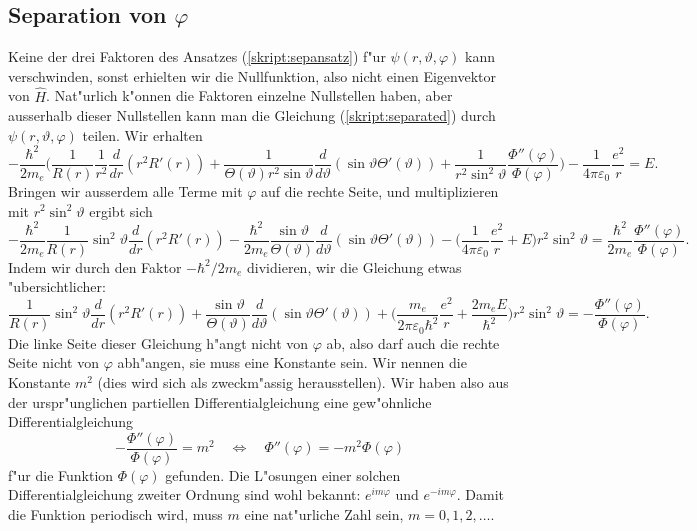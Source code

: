 \subsection{Separation von $\varphi$}
Keine der drei Faktoren des Ansatzes (\ref{skript:sepansatz}) f"ur
$\psi(r,\vartheta,\varphi)$ kann verschwinden, sonst erhielten wir die 
Nullfunktion, also nicht einen Eigenvektor von $\hat H$.
Nat"urlich k"onnen die Faktoren einzelne Nullstellen haben, aber ausserhalb
dieser Nullstellen kann man die Gleichung (\ref{skript:separated}) durch 
$\psi(r,\vartheta,\varphi)$ teilen. Wir erhalten
\begin{equation*}
-\frac{\hbar^2}{2m_e}\biggl(
\frac{1}{R(r)}
\frac{1}{r^2}
\frac{d}{dr}(r^2R'(r))
+
\frac{1}{\Theta(\vartheta) r^2\sin\vartheta}\frac{d}{d\vartheta}(\sin\vartheta \Theta'(\vartheta))
+
\frac{1}{r^2\sin^2\vartheta}\frac{\Phi''(\varphi)}{\Phi(\varphi)}
\biggr)
-\frac1{4\pi\varepsilon_0}\frac{e^2}{r}
=
E.
\end{equation*}
Bringen wir ausserdem alle Terme mit $\varphi$ auf die rechte Seite,
und multiplizieren mit $r^2\sin^2\vartheta$
ergibt sich
\begin{equation*}
-\frac{\hbar^2}{2m_e}
\frac{1}{R(r)}\sin^2\vartheta \frac{d}{dr}(r^2R'(r))
-
\frac{\hbar^2}{2m_e}
\frac{\sin\vartheta}{\Theta(\vartheta) }\frac{d}{d\vartheta}(\sin\vartheta \Theta'(\vartheta))
-\biggl(\frac1{4\pi\varepsilon_0}\frac{e^2}{r}
+
E\biggr)r^2\sin^2\vartheta
=
\frac{\hbar^2}{2m_e}\frac{\Phi''(\varphi)}{\Phi(\varphi)}.
\end{equation*}
Indem wir durch den Faktor $-\hbar^2/2m_e$ dividieren, wir die Gleichung
etwas "ubersichtlicher:
\begin{equation}
\frac{1}{R(r)}\sin^2\vartheta \frac{d}{dr}(r^2R'(r))
+
\frac{\sin\vartheta}{\Theta(\vartheta) }\frac{d}{d\vartheta}(\sin\vartheta \Theta'(\vartheta))
+\biggl(\frac{m_e}{2\pi\varepsilon_0\hbar^2}\frac{e^2}{r}
+
\frac{2m_eE}{\hbar^2}\biggr)r^2\sin^2\vartheta
=
-\frac{\Phi''(\varphi)}{\Phi(\varphi)}.
\label{skript:phisepariert}
\end{equation}
Die linke Seite dieser Gleichung h"angt nicht von $\varphi$ ab, also
darf auch die rechte Seite nicht von $\varphi$ abh"angen, sie muss
eine Konstante sein. Wir nennen die Konstante $m^2$ (dies wird sich
als zweckm"assig herausstellen). Wir haben also aus der urspr"unglichen
partiellen Differentialgleichung eine gew"ohnliche Differentialgleichung
\[
-\frac{\Phi''(\varphi)}{\Phi(\varphi)}=m^2
\quad\Leftrightarrow\quad
\Phi''(\varphi)=-m^2\Phi(\varphi)
\]
f"ur die Funktion $\Phi(\varphi)$ gefunden.
Die L"osungen einer solchen Differentialgleichung zweiter Ordnung sind
wohl bekannt: $e^{im\varphi}$ und $e^{-im\varphi}$. Damit die Funktion
periodisch wird, muss $m$ eine nat"urliche Zahl sein, $m=0,1,2,\dots$.

